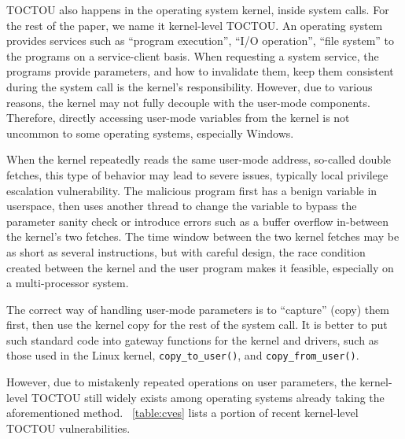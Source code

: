 TOCTOU also happens in the operating system kernel, inside system calls. For the rest of the paper, we name it kernel-level TOCTOU. An operating system provides services such as ``program execution'', ``I/O operation'', ``file system'' to the programs on a service-client basis. When requesting a system service, the programs provide parameters, and how to invalidate them, keep them consistent during the system call is the kernel's responsibility. However, due to various reasons, the kernel may not fully decouple with the user-mode components. Therefore, directly accessing user-mode variables from the kernel is not uncommon to some operating systems, especially Windows.

When the kernel repeatedly reads the same user-mode address, so-called double fetches, this type of behavior may lead to severe issues, typically local privilege escalation vulnerability. The malicious program first has a benign variable in userspace, then uses another thread to change the variable to bypass the parameter sanity check or introduce errors such as a buffer overflow in-between the kernel's two fetches. The time window between the two kernel fetches may be as short as several instructions,  but with careful design, the race condition created between the kernel and the user program makes it feasible, especially on a multi-processor system.



The correct way of handling user-mode parameters is to ``capture'' (copy) them first, then use the kernel copy for the rest of the system call. It is better to put such standard code into gateway functions for the kernel and drivers, such as those used in the Linux kernel, \texttt{copy\_to\_user()}, and \texttt{copy\_from\_user()}.

However, due to mistakenly repeated operations on user parameters, the kernel-level TOCTOU still widely exists among operating systems already taking the aforementioned method. ~\autoref{table:cves} lists a portion of recent kernel-level TOCTOU vulnerabilities.

